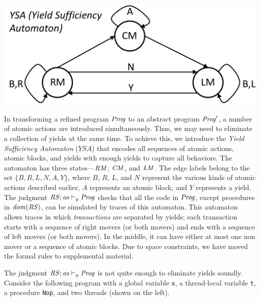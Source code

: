 \newcommand{\YSA}{\mathit{YSA}}

\begin{center}
\includegraphics[scale=0.35]{YieldTypeCheckingAutomaton.pdf}
\end{center}

In transforming a refined program $\mathit{Prog}$ to an abstract program $\mathit{Prog}'$, a number of atomic actions 
are introduced simultaneously.
Thus, we may need to eliminate a collection of yields at the same time.
To achieve this, we introduce the {\em Yield Sufficiency Automaton\/} ($\YSA$) that encodes 
all sequences of atomic actions, atomic blocks, and yields with enough yields to capture all behaviors.
The automaton has three states---$\mathit{RM}$, $\mathit{CM}$, and $\mathit{LM}$.
The edge labels belong to the set $\{B,R,L,N,A,Y\}$, where $B$, $R$, $L$, and $N$ represent the various kinds 
of atomic actions described earlier, $A$ represents an atomic block, and $Y$ represents a yield.
The judgment $\mathit{RS};\mathit{as} \vdash_y \mathit{Prog}$ checks that all the code in $\mathit{Prog}$, except procedures in $\mathit{dom}(\mathit{RS})$,
can be simulated by traces of this automaton.
This automaton allows traces in which {\em transactions\/} are separated by yields;
each transaction starts with a sequence of right movers (or both movers) and ends with a sequence of left movers (or both movers).
In the middle, it can have either at most one non mover or a sequence of atomic blocks.
Due to space constraints, we have moved the formal rules to supplemental material.

The judgment $\mathit{RS};\mathit{as} \vdash_y \mathit{Prog}$ is not quite enough to eliminate yields soundly.
Consider the following program with a global variable {\tt x}, a thread-local variable {\tt t},
a procedure {\tt Nop}, and two threads (shown on the left).

